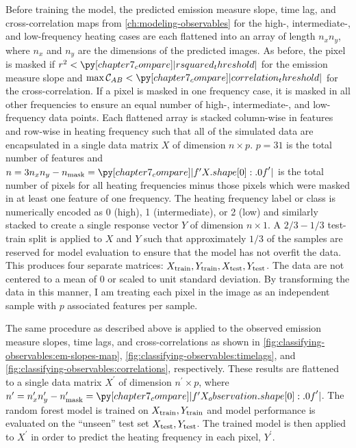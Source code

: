 Before training the model, the predicted emission measure slope, time lag, and cross-correlation maps from \autoref{ch:modeling-observables} for the high-, intermediate-, and low-frequency heating cases are each flattened into an array of length $n_xn_y$, where $n_x$ and $n_y$ are the dimensions of the predicted images. As before, the pixel is masked if $r^2<\py[chapter7_compare]|rsquared_threshold|$ for the emission measure slope and $\max\mathcal{C}_{AB}<\py[chapter7_compare]|correlation_threshold|$ for the cross-correlation. If a pixel is masked in one frequency case, it is masked in all other frequencies to ensure an equal number of high-, intermediate-, and low-frequency data points. Each flattened array is stacked column-wise in features and row-wise in heating frequency such that all of the simulated data are encapsulated in a single data matrix $X$ of dimension $n\times p$. $p=31$ is the total number of features and $n=3n_xn_y - n_\textup{mask}=\py[chapter7_compare]|f'{X.shape[0]:.0f}'|$ is the total number of pixels for all heating frequencies minus those pixels which were masked in at least one feature of one frequency. The heating frequency label or class is numerically encoded as 0 (high), 1 (intermediate), or 2 (low) and similarly stacked to create a single response vector $Y$ of dimension $n\times1$. A $2/3-1/3$ test-train split is applied to $X$ and $Y$ such that approximately $1/3$ of the samples are reserved for model evaluation to ensure that the model has not overfit the data. This produces four separate matrices: $X_\textup{train},Y_\textup{train},X_\textup{test},Y_\textup{test}$. The data are not centered to a mean of 0 or scaled to unit standard deviation. By transforming the data in this manner, I am treating each pixel in the image as an independent sample with $p$ associated features per sample.

The same procedure as described above is applied to the observed emission measure slopes, time lags, and cross-correlations as shown in \autoref{fig:classifying-observables:em-slopes-map}, \autoref{fig:classifying-observables:timelags}, and \autoref{fig:classifying-observables:correlations}, respectively. These results are flattened to a single data matrix $X^\prime$ of dimension $n^\prime\times p$, where $n^\prime=n_x^\prime n_y^\prime - n^\prime_\textup{mask}=\py[chapter7_compare]|f'{X_observation.shape[0]:.0f}'|$. The random forest model is trained on $X_\textup{train},Y_\textup{train}$ and model performance is evaluated on the ``unseen'' test set $X_\textup{test},Y_\textup{test}$. The trained model is then applied to $X^\prime$ in order to predict the heating frequency in each pixel, $Y^\prime$.

